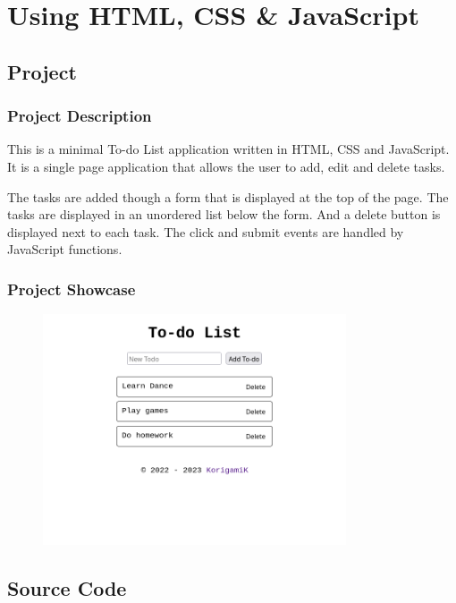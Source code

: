 \section{Using HTML, CSS \& JavaScript}\label{sec:html}

\subsection{Project}

\subsubsection*{Project Description}

This is a minimal To-do List application written in HTML, CSS and JavaScript. It is a single page application that allows the user to add, edit and delete tasks.

The tasks are added though a form that is displayed at the top of the page.
The tasks are displayed in an unordered list below the form. And a delete button is displayed next to each task.
The click and submit events are handled by JavaScript functions.

\subsubsection*{Project Showcase}

\begin{figure}[ht]
    \centering
    \includegraphics[width=0.8\textwidth]{res/todo-list.png}
\end{figure}

\pagebreak

\subsection{Source Code}

\inputminted[linenos, breaklines, encoding=utf8, frame=lines]{html}{"./code/todo-list.html"}


\pagebreak
